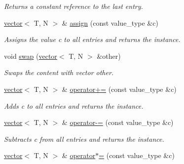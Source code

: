\begin{DoxyCompactItemize}
\begin{DoxyCompactList}\small\item\em Returns a constant reference to the last entry. \end{DoxyCompactList}\item 
\hypertarget{a00559_a3dd094e0c18ed733564b2264e741381d}{\hyperlink{a00559}{vector}$<$ T, N $>$ \& \hyperlink{a00559_a3dd094e0c18ed733564b2264e741381d}{assign} (const value\-\_\-type \&c)}\label{a00559_a3dd094e0c18ed733564b2264e741381d}

\begin{DoxyCompactList}\small\item\em Assigns the value c to all entries and returns the instance. \end{DoxyCompactList}\item 
\hypertarget{a00559_a6e359a635d719507448134b4239602bd}{void \hyperlink{a00559_a6e359a635d719507448134b4239602bd}{swap} (\hyperlink{a00559}{vector}$<$ T, N $>$ \&other)}\label{a00559_a6e359a635d719507448134b4239602bd}

\begin{DoxyCompactList}\small\item\em Swaps the content with vector other. \end{DoxyCompactList}\item 
\hypertarget{a00559_ad1a87c1ba015adaeb88433315ef38071}{\hyperlink{a00559}{vector}$<$ T, N $>$ \& \hyperlink{a00559_ad1a87c1ba015adaeb88433315ef38071}{operator+=} (const value\-\_\-type \&c)}\label{a00559_ad1a87c1ba015adaeb88433315ef38071}

\begin{DoxyCompactList}\small\item\em Adds c to all entries and returns the instance. \end{DoxyCompactList}\item 
\hypertarget{a00559_ae2f6dbb764120f23560a30ca98b34a6b}{\hyperlink{a00559}{vector}$<$ T, N $>$ \& \hyperlink{a00559_ae2f6dbb764120f23560a30ca98b34a6b}{operator-\/=} (const value\-\_\-type \&c)}\label{a00559_ae2f6dbb764120f23560a30ca98b34a6b}

\begin{DoxyCompactList}\small\item\em Subtracts c from all entries and returns the instance. \end{DoxyCompactList}\item 
\hypertarget{a00559_a1401bd51aae87d4182645dcc6d2007cf}{\hyperlink{a00559}{vector}$<$ T, N $>$ \& \hyperlink{a00559_a1401bd51aae87d4182645dcc6d2007cf}{operator$\ast$=} (const value\-\_\-type \&c)}\label{a00559_a1401bd51aae87d4182645dcc6d2007cf}


\end{DoxyCompactItemize}
